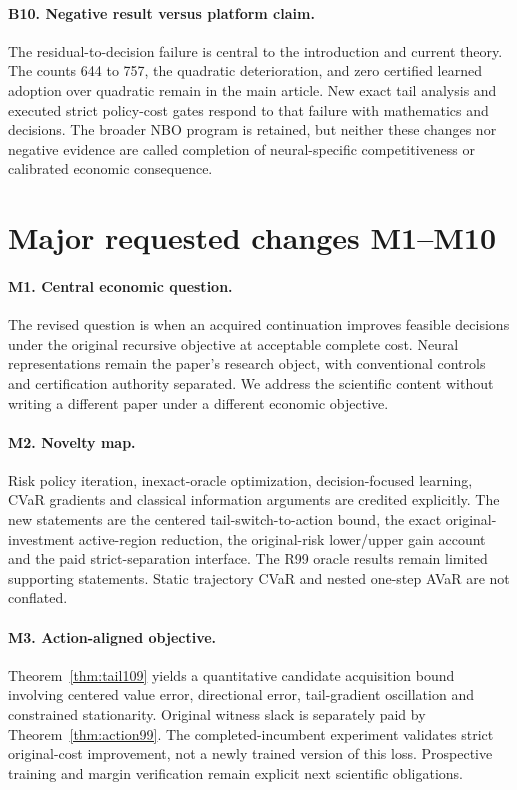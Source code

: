 \documentclass[11pt]{article}
\begin{document}
\paragraph{B10. Negative result versus platform claim.}
The residual-to-decision failure is central to the introduction and current theory. The counts 644 to 757, the quadratic deterioration, and zero certified learned adoption over quadratic remain in the main article. New exact tail analysis and executed strict policy-cost gates respond to that failure with mathematics and decisions. The broader NBO program is retained, but neither these changes nor negative evidence are called completion of neural-specific competitiveness or calibrated economic consequence.

\section*{Major requested changes M1--M10}
\paragraph{M1. Central economic question.}
The revised question is when an acquired continuation improves feasible decisions under the original recursive objective at acceptable complete cost. Neural representations remain the paper's research object, with conventional controls and certification authority separated. We address the scientific content without writing a different paper under a different economic objective.

\paragraph{M2. Novelty map.}
Risk policy iteration, inexact-oracle optimization, decision-focused learning, CVaR gradients and classical information arguments are credited explicitly. The new statements are the centered tail-switch-to-action bound, the exact original-investment active-region reduction, the original-risk lower/upper gain account and the paid strict-separation interface. The R99 oracle results remain limited supporting statements. Static trajectory CVaR and nested one-step AVaR are not conflated.

\paragraph{M3. Action-aligned objective.}
Theorem~\ref{thm:tail109} yields a quantitative candidate acquisition bound involving centered value error, directional error, tail-gradient oscillation and constrained stationarity. Original witness slack is separately paid by Theorem~\ref{thm:action99}. The completed-incumbent experiment validates strict original-cost improvement, not a newly trained version of this loss. Prospective training and margin verification remain explicit next scientific obligations.
\end{document}
